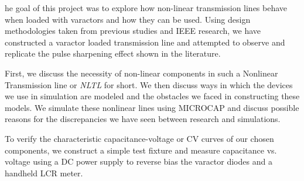 \documentclass[journal]{IEEEtran} \usepackage[english]{babel}
\begin{document}

he goal of this project was to explore how non-linear
transmission lines behave when loaded with varactors and how they can be used.
Using design methodologies taken from previous studies and IEEE research, we
have constructed a varactor loaded transmission line and attempted to observe
and replicate the pulse sharpening effect shown in the literature.

First, we discuss the necessity of non-linear components in such a Nonlinear
Transmission line or \emph{NLTL} for short. We then discuss ways in which the
devices we use in simulation are modeled and the obstacles we faced in constructing
these models. We simulate these nonlinear lines using MICROCAP and discuss
possible reasons for the discrepancies we have seen between research and
simulations.

To verify the characteristic capacitance-voltage or CV curves of our chosen
components, we construct a simple test fixture and measure capacitance vs.
voltage using a DC power supply to reverse bias the varactor diodes and a
handheld LCR meter.



\hfill 



%
%
\end{document}
